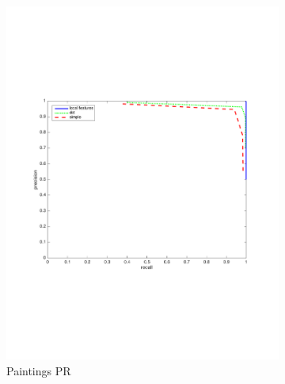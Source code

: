 \documentclass[english,12pt,a4paper,pdftex,elec,utf8, table]{aaltothesis}
\begin{document}
\begin{figure}[htb]
\begin{center}
\begin{subfigure}[b]{0.49\textwidth}
    \includegraphics[width=\textwidth]{figures/SaturatecolorsPR.pdf}
    \caption{Paintings PR}
    \label{Saturaterocthinglink}
  \end{subfigure}
  \begin{subfigure}[b]{0.49\textwidth}

\end{subfigure}
\end{center}
\end{figure}
\end{document}
